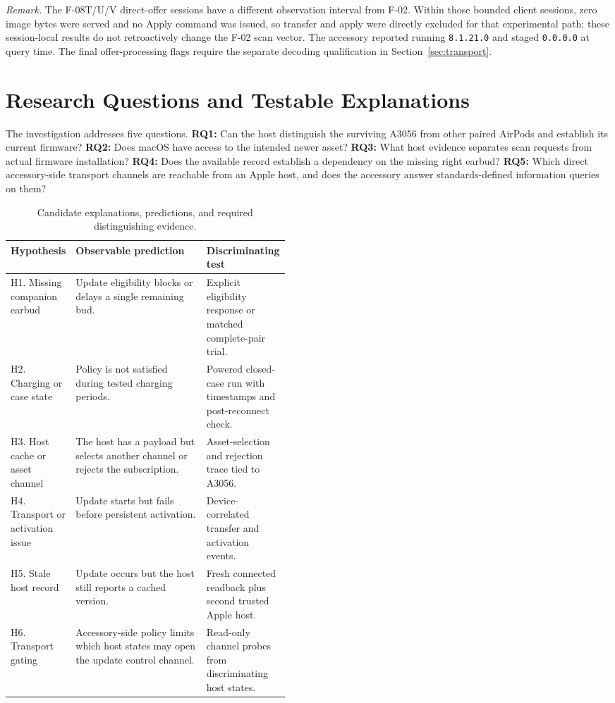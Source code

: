 \documentclass[11pt,letterpaper]{article}
\begin{document}
\emph{Remark.} The F-08T/U/V direct-offer sessions have a different observation interval from F-02. Within those bounded client sessions, zero image bytes were served and no Apply command was issued, so transfer and apply were directly excluded for that experimental path; these session-local results do not retroactively change the F-02 scan vector. The accessory reported running \texttt{8.1.21.0} and staged \texttt{0.0.0.0} at query time. The final offer-processing flags require the separate decoding qualification in Section~\ref{sec:transport}.

\section{Research Questions and Testable Explanations}\label{sec:rq}
The investigation addresses five questions. \textbf{RQ1:} Can the host distinguish the surviving A3056 from other paired AirPods and establish its current firmware? \textbf{RQ2:} Does macOS have access to the intended newer asset? \textbf{RQ3:} What host evidence separates scan requests from actual firmware installation? \textbf{RQ4:} Does the available record establish a dependency on the missing right earbud? \textbf{RQ5:} Which direct accessory-side transport channels are reachable from an Apple host, and does the accessory answer standards-defined information queries on them?

\begin{table}[htbp]\centering\small
\caption{Candidate explanations, predictions, and required distinguishing evidence.}\label{tab:hypotheses}
\begin{tabularx}{\linewidth}{@{}p{0.22\linewidth}X p{0.24\linewidth}@{}}\toprule
Hypothesis & Observable prediction & Discriminating test \\ \midrule
H1. Missing companion earbud & Update eligibility blocks or delays a single remaining bud. & Explicit eligibility response or matched complete-pair trial. \\
H2. Charging or case state & Policy is not satisfied during tested charging periods. & Powered closed-case run with timestamps and post-reconnect check. \\
H3. Host cache or asset channel & The host has a payload but selects another channel or rejects the subscription. & Asset-selection and rejection trace tied to A3056. \\
H4. Transport or activation issue & Update starts but fails before persistent activation. & Device-correlated transfer and activation events. \\
H5. Stale host record & Update occurs but the host still reports a cached version. & Fresh connected readback plus second trusted Apple host. \\
H6. Transport gating & Accessory-side policy limits which host states may open the update control channel. & Read-only channel probes from discriminating host states. \\
\bottomrule\end{tabularx}
\end{table}
\end{document}
